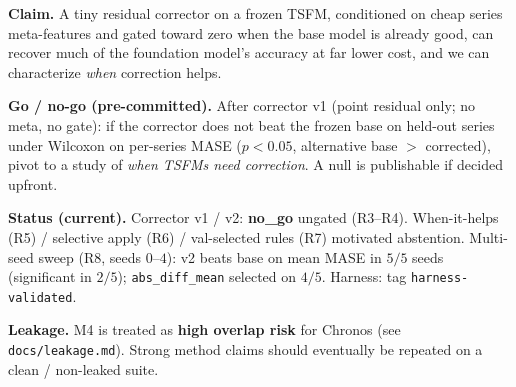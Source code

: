 \noindent\textbf{Claim.}
A tiny residual corrector on a frozen TSFM, conditioned on cheap series
meta-features and gated toward zero when the base model is already good, can
recover much of the foundation model's accuracy at far lower cost, and we can
characterize \emph{when} correction helps.

\noindent\textbf{Go / no-go (pre-committed).}
After corrector v1 (point residual only; no meta, no gate): if the corrector does
not beat the frozen base on held-out series under Wilcoxon on per-series MASE
($p < 0.05$, alternative base $>$ corrected), pivot to a study of
\emph{when TSFMs need correction}. A null is publishable if decided upfront.

\noindent\textbf{Status (current).}
Corrector v1 / v2: \textbf{no\_go} ungated (R3--R4). When-it-helps (R5) /
selective apply (R6) / val-selected rules (R7) motivated abstention.
Multi-seed sweep (R8, seeds $0$--$4$): v2 beats base on mean MASE in $5/5$
seeds (significant in $2/5$); \texttt{abs\_diff\_mean} selected on $4/5$.
Harness: tag \texttt{harness-validated}.

\noindent\textbf{Leakage.}
M4 is treated as \textbf{high overlap risk} for Chronos (see
\texttt{docs/leakage.md}). Strong method claims should eventually be repeated on
a clean / non-leaked suite.
